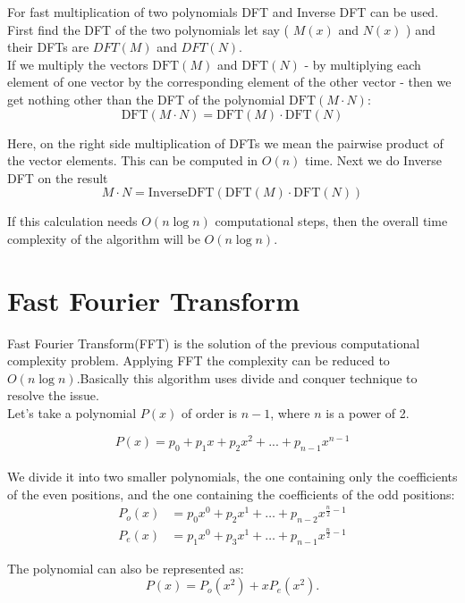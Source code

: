 \documentclass[28pt]{report}
\begin{document}
            For fast multiplication of two polynomials DFT and Inverse DFT can be used. First find the DFT of the two polynomials let say ( $M(x)$ and $N(x)$ ) and their DFTs are $ DFT(M)$ and $ DFT(N) $.\\
            

             If we multiply the vectors $\text{DFT}(M)$ and $\text{DFT}(N)$ - by multiplying each element of one vector by the corresponding element of the other vector - then we get nothing other than the DFT of the polynomial $\text{DFT}(M \cdot N)$:
            $$\text{DFT}(M \cdot N) = \text{DFT}(M) \cdot \text{DFT}(N)$$

            Here, on the right side multiplication of DFTs we mean the pairwise product of the vector elements. This can be computed in $O(n)$ time. Next we do Inverse DFT on the result\\
            $$M \cdot N = \text{InverseDFT}(\text{DFT}(M) \cdot \text{DFT}(N))$$

            If this calculation needs $O(n\log n)$ computational steps, then the overall time complexity of the algorithm will be $O(n\log n)$.
            
\section{Fast Fourier Transform}

Fast Fourier Transform(FFT) is the solution of the previous computational complexity problem. Applying FFT the complexity can be reduced to $O(n\log n)$.Basically this algorithm uses divide and conquer technique to resolve the issue.\\

Let's take a polynomial $P(x)$ of order is $n-1$, where $n$ is a power of 2.

 $$P(x) = p_0 + p_1x 
 + p_2x^2 + ... + p_{n-1}x^{n-1}$$\\
 
 We divide it into two smaller polynomials, the one containing only the coefficients of the even positions, and the one containing the coefficients of the odd positions:
  \begin{align*} P_o(x) &= p_0 x^0 + p_2 x^1 + \dots + p_{n-2} x^{\frac{n}{2}-1} \\ P_e(x) &= p_1 x^0 + p_3 x^1 + \dots + p_{n-1} x^{\frac{n}{2}-1} \end{align*}

  \pagebreak
  The polynomial can also be represented as:\\
  $$P(x) = P_o(x^2) + x P_e(x^2).$$
\end{document}

